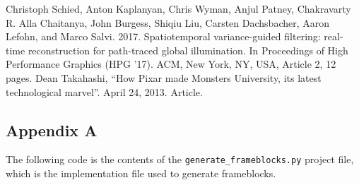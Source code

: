 \documentclass[conference]{IEEEtran}
\begin{document}
\begin{thebibliography}{13}
 Christoph Schied, Anton Kaplanyan, Chris Wyman, Anjul Patney, Chakravarty R. Alla Chaitanya, John Burgess, Shiqiu Liu, Carsten Dachsbacher, Aaron Lefohn, and Marco Salvi. 2017. Spatiotemporal variance-guided filtering: real-time reconstruction for path-traced global illumination. In Proceedings of High Performance Graphics (HPG '17). ACM, New York, NY, USA, Article 2, 12 pages.
 Dean Takahashi, ``How Pixar made Monsters University, its
latest technological marvel''. April 24, 2013. Article.
\end{thebibliography}

\onecolumn

\begin{center}
\section*{Appendix A}
\label{app:a}
\end{center}

The following code is the contents of the
\texttt{generate_frameblocks.py} project file, which is the
implementation file used to generate frameblocks.

\bigskip
\end{document}
